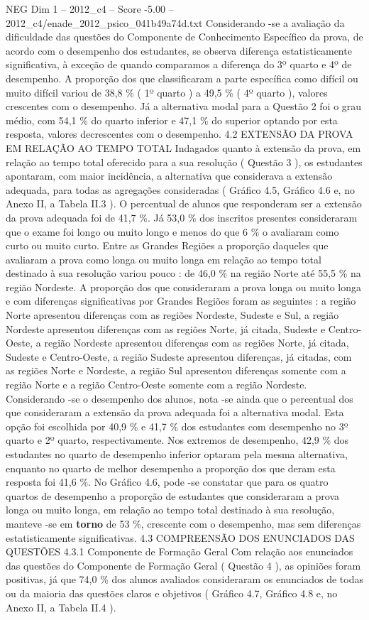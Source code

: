 \begin{textsample}{NEG Dim 1 – 2012\_c4 – Score -5.00 – 2012\_c4/enade\_2012\_psico\_041b49a74d.txt}
Considerando -se a avaliação da dificuldade das questões do Componente de Conhecimento Específico da prova, de acordo com o desempenho dos estudantes, se observa diferença estatisticamente significativa, à exceção de quando comparamos a diferença do 3º quarto e 4º de desempenho.
A proporção dos que classificaram a parte específica como difícil ou muito difícil variou de 38,8 \% ( 1º quarto ) a 49,5 \% ( 4º quarto ), valores crescentes com o desempenho.
Já a alternativa modal para a Questão 2 foi o grau médio, com 54,1 \% do quarto inferior e 47,1 \% do superior optando por esta resposta, valores decrescentes com o desempenho. 4.2 EXTENSÃO DA PROVA EM RELAÇÃO AO TEMPO TOTAL Indagados quanto à extensão da prova, em relação ao tempo total oferecido para a sua resolução ( Questão 3 ), os estudantes apontaram, com maior incidência, a alternativa que considerava a extensão adequada, para todas as agregações consideradas ( Gráfico 4.5, Gráfico 4.6 e, no Anexo II, a Tabela II.3 ).
O percentual de alunos que responderam ser a extensão da prova adequada foi de 41,7 \%.
Já 53,0 \% dos inscritos presentes consideraram que o exame foi longo ou muito longo e menos do que 6 \% o avaliaram como curto ou muito curto.
Entre as Grandes Regiões a proporção daqueles que avaliaram a prova como longa ou muito longa em relação ao tempo total destinado à sua resolução variou pouco : de 46,0 \% na região Norte até 55,5 \% na região Nordeste.
A proporção dos que consideraram a prova longa ou muito longa e com diferenças significativas por Grandes Regiões foram as seguintes : a região Norte apresentou diferenças com as regiões Nordeste, Sudeste e Sul, a região Nordeste apresentou diferenças com as regiões Norte, já citada, Sudeste e Centro- Oeste, a região Nordeste apresentou diferenças com as regiões Norte, já citada, Sudeste e Centro-Oeste, a região Sudeste apresentou diferenças, já citadas, com as regiões Norte e Nordeste, a região Sul apresentou diferenças somente com a região Norte e a região Centro-Oeste somente com a região Nordeste.
Considerando -se o desempenho dos alunos, nota -se ainda que o percentual dos que consideraram a extensão da prova adequada foi a alternativa modal.
Esta opção foi escolhida por 40,9 \% e 41,7 \% dos estudantes com desempenho no 3º quarto e 2º quarto, respectivamente.
Nos extremos de desempenho, 42,9 \% dos estudantes no quarto de desempenho inferior optaram pela mesma alternativa, enquanto no quarto de melhor desempenho a proporção dos que deram esta resposta foi 41,6 \%.
No Gráfico 4.6, pode -se constatar que para os quatro quartos de desempenho a proporção de estudantes que consideraram a prova longa ou muito longa, em relação ao tempo total destinado à sua resolução, manteve -se em \textbf{torno} de 53 \%, crescente com o desempenho, mas sem diferenças estatisticamente significativas. 4.3 COMPREENSÃO DOS ENUNCIADOS DAS QUESTÕES 4.3.1 Componente de Formação Geral Com relação aos enunciados das questões do Componente de Formação Geral ( Questão 4 ), as opiniões foram positivas, já que 74,0 \% dos alunos avaliados consideraram os enunciados de todas ou da maioria das questões claros e objetivos ( Gráfico 4.7, Gráfico 4.8 e, no Anexo II, a Tabela II.4 ).

\end{textsample}
